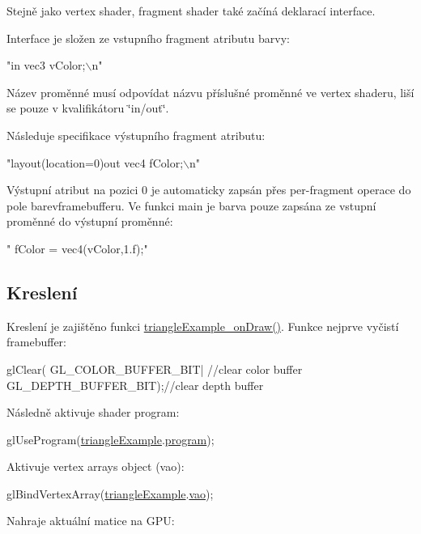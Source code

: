 Stejně jako vertex shader, fragment shader také začíná deklarací interface.\par
 Interface je složen ze vstupního fragment atributu barvy\-: 
\begin{DoxyCodeInclude}
\textcolor{stringliteral}{"in vec3 vColor;\(\backslash\)n"}
\end{DoxyCodeInclude}
Název proměnné musí odpovídat názvu příslušné proměnné ve vertex shaderu, liší se pouze v kvalifikátoru \char`\"{}in/out\char`\"{}.\par
 Následuje specifikace výstupního fragment atributu\-: 
\begin{DoxyCodeInclude}
\textcolor{stringliteral}{"layout(location=0)out vec4 fColor;\(\backslash\)n"}
\end{DoxyCodeInclude}
Výstupní atribut na pozici 0 je automaticky zapsán přes per-\/fragment operace do pole barevframebufferu. Ve funkci main je barva pouze zapsána ze vstupní proměnné do výstupní proměnné\-: 
\begin{DoxyCodeInclude}
\textcolor{stringliteral}{"  fColor = vec4(vColor,1.f);"}
\end{DoxyCodeInclude}
\hypertarget{triangleExample.c_Draw}{}\subsection{Kreslení}\label{triangleExample.c_Draw}
Kreslení je zajištěno funkci \hyperlink{triangleExample_8c_a3c6a1869a7e6614856badd527a9c332f}{triangle\-Example\-\_\-on\-Draw()}. Funkce nejprve vyčistí framebuffer\-: 
\begin{DoxyCodeInclude}
  glClear(
      GL\_COLOR\_BUFFER\_BIT| \textcolor{comment}{//clear color buffer}
      GL\_DEPTH\_BUFFER\_BIT);\textcolor{comment}{//clear depth buffer}
\end{DoxyCodeInclude}
Následně aktivuje shader program\-: 
\begin{DoxyCodeInclude}
  glUseProgram(\hyperlink{triangleExample_8c_af82b723635ac0c90962571915a1b1163}{triangleExample}.\hyperlink{structTriangleExampleVariables_abc287e489a25d4e3c4ad1899d183881d}{program});
\end{DoxyCodeInclude}
Aktivuje vertex arrays object (vao)\-: 
\begin{DoxyCodeInclude}
  glBindVertexArray(\hyperlink{triangleExample_8c_af82b723635ac0c90962571915a1b1163}{triangleExample}.\hyperlink{structTriangleExampleVariables_a4230de13079947c4093b8d75ad1d5035}{vao});
\end{DoxyCodeInclude}
Nahraje aktuální matice na G\-P\-U\-: 
